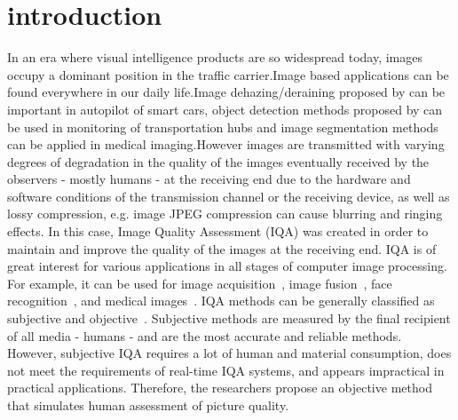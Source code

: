 \documentclass{article}
\begin{document}
\section{introduction}
\label{inrtoduction}
In an era where visual intelligence products are so widespread today, images occupy a dominant position in the traffic carrier.Image based applications can be found everywhere in our daily life.Image dehazing/deraining proposed by \cite{wei2020single,li2021single,wei2021non,li2020region,wu2020subjective,li2020haze,wu2020unified,luo2020single,wu2019beyond} can be important in autopilot of smart cars, object detection methods proposed by \cite{li2018incremental,chen2020high,chen2021bal,qiu2019a2rmnet,ding2020human,li2019simultaneously,li2019headnet,qiu2020hierarchical,qiu2020offset,li2020codan,wang2020multi} can be used in monitoring of transportation hubs and image segmentation methods \cite{yang2020new,shang2019instance,guo2020deep,yang2019new,shi2020query,xu2019bounding,yang2020learning,yang2020mono,shi2018key,meng2019new,luo2018weakly} can be applied in medical imaging.However images are transmitted with varying degrees of degradation in the quality of the images eventually received by the observers - mostly humans - at the receiving end due to the hardware and software conditions of the transmission channel or the receiving device, as well as lossy compression, e.g. image JPEG compression can cause blurring and ringing effects. In this case, Image Quality Assessment (IQA) was created in order to maintain and improve the quality of the images at the receiving end. IQA is of great interest for various applications in all stages of computer image processing. For example, it can be used for image acquisition~\cite{Feng2005Psy}, image fusion~\cite{1247209}, face recognition~\cite{ji2012fusion}, and medical images~\cite{chow2016review}. IQA methods can be generally classified as subjective and objective~\cite{wang2008hvs}. Subjective methods are measured by the final recipient of all media - humans - and are the most accurate and reliable methods. However, subjective IQA requires a lot of human and material consumption, does not meet the requirements of real-time IQA systems, and appears impractical in practical applications. Therefore, the researchers propose an objective method that simulates human assessment of picture quality.
\end{document}
